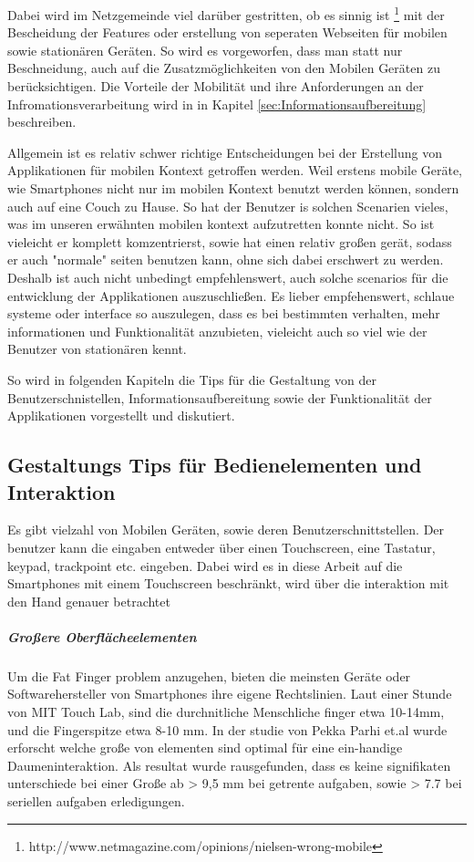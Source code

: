 Dabei wird im Netzgemeinde viel darüber gestritten, ob es sinnig ist \footnote{http://www.netmagazine.com/opinions/nielsen-wrong-mobile} mit der Bescheidung der Features oder erstellung von seperaten Webseiten für mobilen sowie stationären Geräten. So wird es vorgeworfen, dass man statt nur Beschneidung, auch auf die Zusatzmöglichkeiten von den Mobilen Geräten zu berücksichtigen. Die Vorteile der Mobilität und ihre Anforderungen an der Infromationsverarbeitung wird in in Kapitel \ref{sec:Informationsaufbereitung} beschreiben.

Allgemein ist es relativ schwer richtige Entscheidungen bei der Erstellung von Applikationen für mobilen Kontext getroffen werden. Weil erstens mobile Geräte, wie Smartphones nicht nur im mobilen Kontext benutzt werden können, sondern auch auf eine Couch zu Hause. So hat der Benutzer is solchen Scenarien vieles, was im unseren erwähnten mobilen kontext aufzutretten konnte nicht. So ist vieleicht er komplett komzentrierst, sowie hat einen relativ großen gerät, sodass er auch "normale" seiten benutzen kann, ohne sich dabei erschwert zu werden. Deshalb ist auch nicht unbedingt empfehlenswert, auch solche scenarios für die entwicklung der Applikationen auszuschließen. Es lieber empfehenswert, schlaue systeme oder interface so auszulegen, dass es bei bestimmten verhalten, mehr informationen und Funktionalität anzubieten, vieleicht auch so viel wie der Benutzer von stationären kennt.

So wird in folgenden Kapiteln die Tips für die Gestaltung von der Benutzerschnistellen, Informationsaufbereitung sowie der Funktionalität der Applikationen vorgestellt und diskutiert.


\subsection{Gestaltungs Tips für Bedienelementen und Interaktion}
\label{sub:Benutzerschnittstellen}

Es gibt vielzahl von Mobilen Geräten, sowie deren Benutzerschnittstellen. Der benutzer kann die eingaben entweder über einen Touchscreen, eine Tastatur, keypad, trackpoint etc. eingeben. Dabei wird es in diese Arbeit auf die Smartphones mit einem Touchscreen beschränkt, wird über die interaktion mit den Hand genauer betrachtet

\subparagraph{Großere Oberflächeelementen} 
\label{subp:gro_ere_interface_elementen}

Um die Fat Finger problem anzugehen, bieten die meinsten Geräte oder Softwarehersteller von Smartphones ihre eigene Rechtslinien. Laut einer Stunde von MIT Touch Lab, sind die durchnitliche Menschliche finger etwa 10-14mm, und die Fingerspitze etwa 8-10 mm\cite{Srinivasan:2003uu}. In der studie von Pekka Parhi et.al\cite{Parhi:2006gh} wurde erforscht welche große von elementen sind optimal für eine ein-handige Daumeninteraktion. Als resultat wurde rausgefunden, dass es keine signifikaten unterschiede bei einer Große ab > 9,5 mm bei getrente aufgaben, sowie > 7.7 bei seriellen aufgaben erledigungen.  

